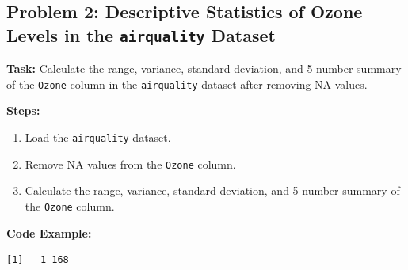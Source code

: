 \documentclass[
  letterpaper,
  DIV=11,
  numbers=noendperiod]{scrreprt}
\newenvironment{Shaded}{\begin{snugshade}}{\end{snugshade}}
\newcommand{\CommentTok}[1]{\textcolor[rgb]{0.37,0.37,0.37}{#1}}
\newcommand{\FunctionTok}[1]{\textcolor[rgb]{0.28,0.35,0.67}{#1}}
\newcommand{\NormalTok}[1]{\textcolor[rgb]{0.00,0.23,0.31}{#1}}
\newcommand{\OtherTok}[1]{\textcolor[rgb]{0.00,0.23,0.31}{#1}}
\newcommand{\SpecialCharTok}[1]{\textcolor[rgb]{0.37,0.37,0.37}{#1}}
\providecommand{\tightlist}{%
  \setlength{\itemsep}{0pt}\setlength{\parskip}{0pt}}\usepackage{longtable,booktabs,array}
\begin{document}
\subsection*{\texorpdfstring{Problem 2: Descriptive Statistics of Ozone
Levels in the \texttt{airquality}
Dataset}{Problem 2: Descriptive Statistics of Ozone Levels in the airquality Dataset}}\label{problem-2-descriptive-statistics-of-ozone-levels-in-the-airquality-dataset}

\textbf{Task:} Calculate the range, variance, standard deviation, and
5-number summary of the \texttt{Ozone} column in the \texttt{airquality}
dataset after removing NA values.

\textbf{Steps:}

\begin{enumerate}
\def\labelenumi{\arabic{enumi}.}
\tightlist
\item
  Load the \texttt{airquality} dataset.
\item
  Remove NA values from the \texttt{Ozone} column.
\item
  Calculate the range, variance, standard deviation, and 5-number
  summary of the \texttt{Ozone} column.
\end{enumerate}

\textbf{Code Example:}

\begin{Shaded}
\end{Shaded}

\begin{verbatim}
[1]   1 168
\end{verbatim}
\end{document}
